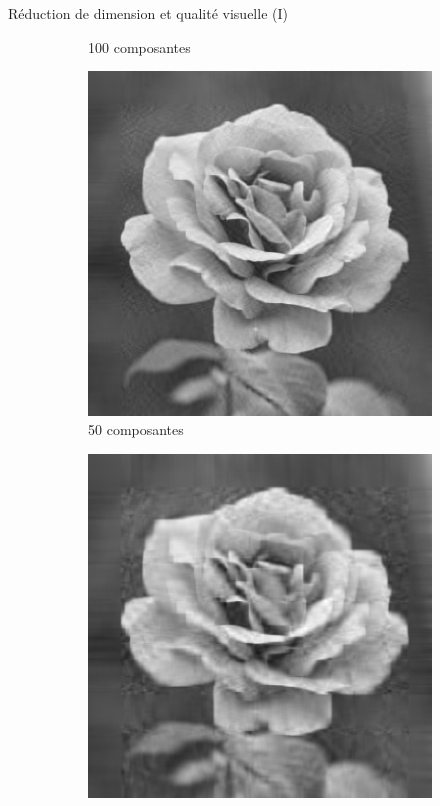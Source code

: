 \documentclass{beamer}
\begin{document}
\begin{frame}{Réduction de dimension et qualité visuelle (I)}
\begin{figure}
\begin{subfigure}{0.18\textwidth}
    \caption*{100 composantes}
  \end{subfigure}\hfill
  \begin{subfigure}{0.18\textwidth}
    \includegraphics[width=\linewidth]{images/pca_50.png}
    \caption*{50 composantes}
  \end{subfigure}\hfill
  \begin{subfigure}{0.18\textwidth}
    \includegraphics[width=\linewidth]{images/pca_25.png}

\end{subfigure}
\end{figure}
\end{frame}
\end{document}
